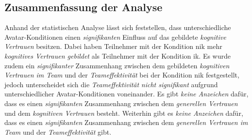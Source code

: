 \documentclass[a4paper,11pt]{article}%
\renewcommand{\\}{\vspace*{0.5\baselineskip} \newline}
\begin{document}
{{\begin{itemize}
\end{itemize}
%
%


\subsection{Zusammenfassung der Analyse}
Anhand der statistischen Analyse lässt sich feststellen, dass unterschiedliche Avatar-Konditionen einen \textit{signifikanten} Einfluss auf das gebildete \textit{kognitive Vertrauen} besitzen. Dabei haben Teilnehmer mit der Kondition \ac{nik} mehr \textit{kognitives Vertrauen gebildet} als Teilnehmer mit der Kondition \ac{ik}. 
Es wurde zudem ein \textit{signifikanter} Zusammenhang zwischen dem gebildeten \textit{kognitiven Vertrauen im Team} und der \textit{Teameffektivität} bei der Kondition \ac{nik} festgestellt, jedoch unterscheidet sich die \textit{Teameffektivität} \textit{nicht signifikant} aufgrund unterschiedlicher Avatar-Konditionen voneinander.
Es gibt \textit{keine Anzeichen} dafür, dass es einen \textit{signifikanten} Zusammenhang zwischen dem \textit{generellen Vertrauen} und dem \textit{kognitiven Vertrauen} besteht. 
Weiterhin gibt es \textit{keine Anzeichen} dafür, dass es einen \textit{signifikanten} Zusammenhang zwischen dem \textit{generellen Vertrauen im Team} und der \textit{Teameffektivität} gibt.

}}
\end{document}
